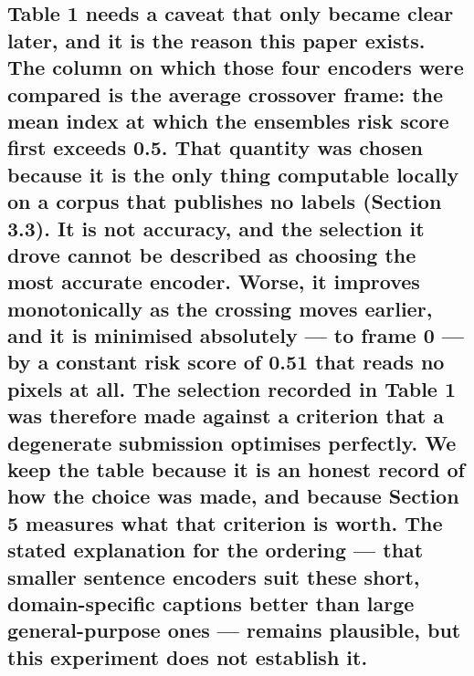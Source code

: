 {\subsection*{Table 1 needs a caveat that only became clear later, and it is the reason this paper exists. The column on which those four encoders were compared is the average crossover frame: the mean index at which the ensemble\textquotesingle s risk score first exceeds 0.5. That quantity was chosen because it is the only thing computable locally on a corpus that publishes no labels (Section 3.3). It is not accuracy, and the selection it drove cannot be described as choosing the most accurate encoder. Worse, it improves monotonically as the crossing moves earlier, and it is minimised absolutely --- to frame 0 --- by a constant risk score of 0.51 that reads no pixels at all. The selection recorded in Table 1 was therefore made against a criterion that a degenerate submission optimises perfectly. We keep the table because it is an honest record of how the choice was made, and because Section 5 measures what that criterion is worth. The stated explanation for the ordering --- that smaller sentence encoders suit these short, domain-specific captions better than large general-purpose ones --- remains plausible, but this experiment does not establish it.}\label{table-1-needs-a-caveat-that-only-became-clear-later-and-it-is-the-reason-this-paper-exists.-the-column-on-which-those-four-encoders-were-compared-is-the-average-crossover-frame-the-mean-index-at-which-the-ensembles-risk-score-first-exceeds-0.5.-that-quantity-was-chosen-because-it-is-the-only-thing-computable-locally-on-a-corpus-that-publishes-no-labels-section-3.3.-it-is-not-accuracy-and-the-selection-it-drove-cannot-be-described-as-choosing-the-most-accurate-encoder.-worse-it-improves-monotonically-as-the-crossing-moves-earlier-and-it-is-minimised-absolutely-to-frame-0-by-a-constant-risk-score-of-0.51-that-reads-no-pixels-at-all.-the-selection-recorded-in-table-1-was-therefore-made-against-a-criterion-that-a-degenerate-submission-optimises-perfectly.-we-keep-the-table-because-it-is-an-honest-record-of-how-the-choice-was-made-and-because-section-5-measures-what-that-criterion-is-worth.-the-stated-explanation-for-the-ordering-that-smaller-sentence-encoders-suit-these-short-domain-specific-captions-better-than-large-general-purpose-ones-remains-plausible-but-this-experiment-does-not-establish-it.}}
